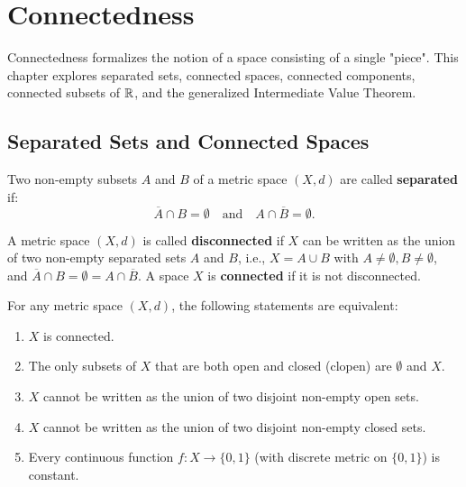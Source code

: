 \chapter{Connectedness}
\label{chap:connectedness}

Connectedness formalizes the notion of a space consisting of a single "piece". This chapter explores separated sets, connected spaces, connected components, connected subsets of $\mathbb{R}$, and the generalized Intermediate Value Theorem.

\section{Separated Sets and Connected Spaces}
\label{sec:separated_sets}

\begin{definition}
Two non-empty subsets $A$ and $B$ of a metric space $(X,d)$ are called \textbf{separated} if:
\[
\overline{A} \cap B = \emptyset \quad \text{and} \quad A \cap \overline{B} = \emptyset.
\]
\end{definition}

\begin{definition}
A metric space $(X,d)$ is called \textbf{disconnected} if $X$ can be written as the union of two non-empty separated sets $A$ and $B$, i.e., $X = A \cup B$ with $A \neq \emptyset, B \neq \emptyset$, and $\overline{A} \cap B = \emptyset = A \cap \overline{B}$. A space $X$ is \textbf{connected} if it is not disconnected.
\end{definition}

\begin{theorem}
For any metric space $(X,d)$, the following statements are equivalent:
\begin{enumerate}[label=\rm{(\roman*)}]
    \item $X$ is connected.
    \item The only subsets of $X$ that are both open and closed (clopen) are $\emptyset$ and $X$.
    \item $X$ cannot be written as the union of two disjoint non-empty open sets.
    \item $X$ cannot be written as the union of two disjoint non-empty closed sets.
    \item Every continuous function $f: X \to \{0,1\}$ (with discrete metric on $\{0,1\}$) is constant.
\end{enumerate}
\end{theorem}


